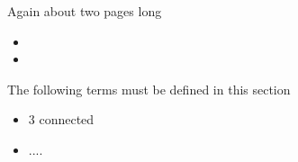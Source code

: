 Again about two pages long

\begin{itemize}
\item {}
\item {}
\end{itemize}

The following terms must be defined  in this section

\begin{itemize}
\item 3 connected
\item  ....
\end{itemize}




